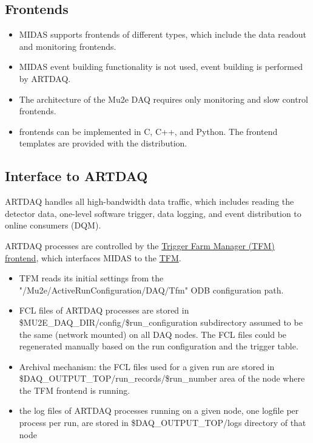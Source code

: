 \subsection{Frontends}

\begin{itemize}
\item 
  MIDAS supports frontends of different types, which include the data readout and monitoring
  frontends.
\item 
  MIDAS event building functionality is not used, event building is performed by ARTDAQ.
\item 
  The architecture of the Mu2e DAQ requires only monitoring and slow control frontends.
\item
  frontends can be implemented in C, C++, and Python. The frontend templates are provided
  with the distribution.
\end{itemize}


\subsection{Interface to ARTDAQ}
ARTDAQ handles all high-bandwidth data traffic, which includes reading the
detector data, one-level software trigger, data logging, and event distribution
to online consumers (DQM).

ARTDAQ processes are controlled by the  \href{https://github.com/pavel1murat/frontends/blob/main/tfm_frontend/tfm_launch_fe.py}
{\blue Trigger Farm Manager (TFM) frontend}, which interfaces MIDAS to the
\href{https://github.com/pavel1murat/tfm/blob/main/rc/control/farm_manager.py}{\blue TFM}.

\begin{itemize}
\item 
  TFM reads its initial settings from the "/Mu2e/ActiveRunConfiguration/DAQ/Tfm"
  ODB configuration path.
\item
  FCL files of ARTDAQ processes are stored in \$MU2E\_DAQ\_DIR/config/\$run\_configuration
  subdirectory assumed to be the same (network mounted) on all DAQ nodes.
  The FCL files could be regenerated manually based on the run configuration and the trigger table.
\item
  Archival mechanism: the FCL files used for a given run are stored in \\
  \$DAQ\_OUTPUT\_TOP/run\_records/\$run\_number area of the node where the TFM frontend is running.
\item
  the log files of ARTDAQ processes running on a given node, one logfile per process per run,
  are stored in \$DAQ\_OUTPUT\_TOP/logs directory of that node
\end{itemize}



